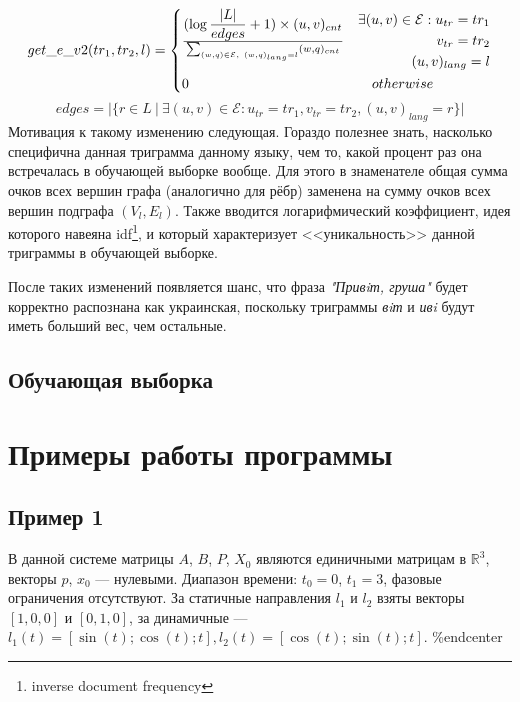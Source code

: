 \documentclass[a4paper, 14pt]{article}
\begin{document}
			\[
 			get\_e\_v2(tr_1, tr_2, l) =
 			  \begin{dcases}
  			   {(\log{|L| \over edges} + 1) \times (u, v)_{cnt}} 
  			   \over \sum_{(w, q) \in \mathcal{E},\ (w, q)_{lang}=l} (w, q)_{cnt} & 
  			    \begin{split} 
						 \exists (u, v) \in \mathcal{E}:  u_{tr}=tr_1 \\ v_{tr}=tr_2 \\ (u, v)_{lang}=l
  			   	\end{split} \\
  			   0 & \quad otherwise
  			 \end{dcases}
			\]	
			$$ edges = |\{r \in L \ | \ \exists (u, v) \in \mathcal{E}: u_{tr}=tr_1, v_{tr}=tr_2, (u, v)_{lang}=r\}| $$
			Мотивация к такому изменению следующая. Гораздо полезнее знать, насколько специфична данная триграмма данному языку, чем то, какой процент
			раз она встречалась в обучающей выборке вообще. Для этого в знаменателе общая сумма очков всех вершин графа (аналогично для рёбр) заменена 
			на сумму очков всех вершин подграфа $(V_{l}, E_{l})$. Также вводится логарифмический коэффициент, идея которого 
			навеяна idf\footnote{inverse document frequency}, и который характеризует <<уникальность>> данной триграммы в обучающей выборке.
			
			После таких изменений появляется шанс, что фраза \textit{"Привiт, груша"} будет корректно распознана как украинская, поскольку триграммы
			\textit{вiт} и \textit{ивi} будут иметь больший вес, чем остальные.
		\subsection{Обучающая выборка}       
       
\section{Примеры работы программы}
	\subsection{Пример 1}
		В данной системе матрицы $A$, $B$, $P$, $X_0$ являются единичными матрицам в $\mathbb{R}^3$, векторы $p$, $x_0$ --- нулевыми. Диапазон времени: $t_0 = 0$, $t_1 = 3$, фазовые ограничения отсутствуют. За статичные направления $l_1$ и $l_2$ взяты векторы $[1, 0, 0]$ и $[0, 1, 0]$, за динамичные --- $l_1(t) = [\sin(t); \cos(t); t], l_2(t) = [\cos(t); \sin(t); t]$.
	\%end{center}			
\end{document}
